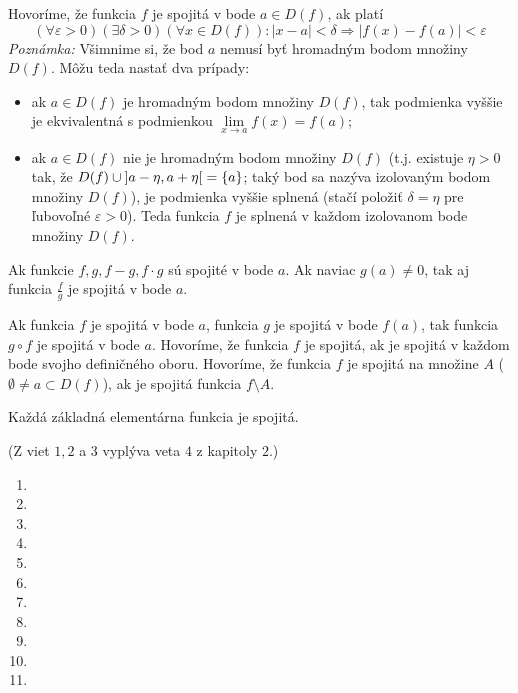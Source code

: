 Hovoríme, že funkcia $f$ je spojitá v bode $a \in D(f)$, ak platí
\[
  (\forall \varepsilon > 0)
    (\exists \delta > 0)
      (\forall x \in D(f)):
        |x-a| < \delta \Rightarrow |f(x)-f(a)| < \varepsilon
\]
\textit{Poznámka:} Všimnime si, že bod $a$ nemusí byť hromadným bodom množiny
$D(f)$. Môžu teda nastať dva prípady:
\begin{itemize}
\item
  ak $a \in D(f)$ je hromadným bodom množiny $D(f)$, tak podmienka vyššie je
  ekvivalentná s podmienkou $\lim\limits_{x \rightarrow a} f(x)=f(a)$;
\item
  ak $a \in D(f)$ nie je hromadným bodom množiny $D(f)$ (t.j. existuje $\eta > 0
  $ tak, že $D(f) \cup \interval[open]{a-\eta}{a+\eta}=\{ a\}$; taký bod sa
  nazýva izolovaným bodom množiny $D(f)$), je podmienka vyššie splnená (stačí
  položiť $\delta=\eta$ pre ľubovoľné $\varepsilon > 0$). Teda funkcia $f$ je
  splnená v každom izolovanom bode množiny $D(f)$.
\end{itemize}

\begin{veta}
Ak funkcie $f,g,f-g,f \cdot g$ sú spojité v bode $a$. Ak naviac $g(a) \neq 0$,
tak aj funkcia $\frac{f}{g}$ je spojitá v bode $a$.
\end{veta}

\begin{veta}
Ak funkcia $f$ je spojitá v bode $a$, funkcia $g$ je spojitá v bode $f(a)$, tak
funkcia $g \circ f$ je spojitá v bode $a$. Hovoríme, že funkcia $f$ je spojitá,
ak je spojitá v každom bode svojho definičného oboru. Hovoríme, že funkcia $f$
je spojitá na množine $A$ ($\emptyset\neq a\subset D(f)$), ak je spojitá funkcia
$f \setminus A$.
\end{veta}

\begin{veta}
Každá základná elementárna funkcia je spojitá.
\end{veta}
(Z viet $1,2$ a $3$ vyplýva veta $4$ z kapitoly $2.$)
\begin{enumerate}[resume]
  \item {}
  \item {}
  \item {}
  \item {}
  \item {}
  \item {}
  \item {}
  \item {}
  \item {}
  \item {}
  \item {}
\end{enumerate}

